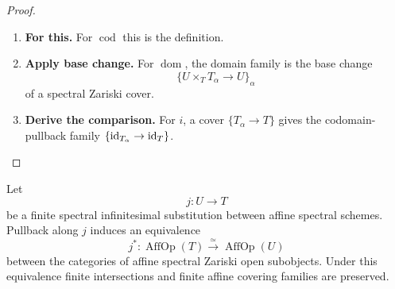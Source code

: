 \begin{proof}
\leavevmode
\begin{enumerate}[label=\textup{(\arabic*)}]
    \item \textbf{For this.}
    For \(\operatorname{cod}\) this is the definition.

    \item \textbf{Apply base change.}
    For \(\operatorname{dom}\), the domain family is the base change
    \[
        \{U\times_TT_\alpha\to U\}_\alpha
    \]
    of a spectral Zariski cover.

    \item \textbf{Derive the comparison.}
    For \(i\), a cover \(\{T_\alpha\to T\}\) gives the codomain-pullback family \(\{\operatorname{id}_{T_\alpha}\to\operatorname{id}_T\}\).
\end{enumerate}
\end{proof}

\begin{lemma}
\label{lem:finite-infinitesimal-affine-open-invariance}
Let
\[
    j:U\longrightarrow T
\]
be a finite spectral infinitesimal substitution between affine spectral
schemes. Pullback along \(j\) induces an equivalence
\[
    j^*:
    \operatorname{AffOp}(T)
    \xrightarrow{\simeq}
    \operatorname{AffOp}(U)
\]
between the categories of affine spectral Zariski open subobjects. Under this
equivalence finite intersections and finite affine covering families are
preserved.
\end{lemma}

